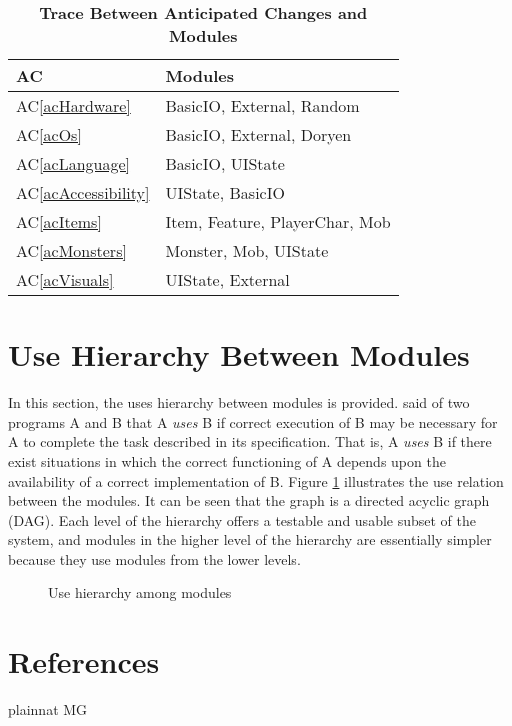 \documentclass[12pt, titlepage]{article}
\newcommand{\newSection}[1]{
  \newpage
  \section{#1}
}
\newcommand{\acref}[1]{AC\ref{#1}}
\begin{document}
\begin{table}[H] 
    \label{TblACT}
    \caption{\bf Trace Between Anticipated Changes and Modules}
    
    \def\arraystretch{1.2}
    \centering
    \bigskip
    \begin{tabular}{p{} p{}}

        \toprule
        \textbf{AC} & \textbf{Modules}\\
        \midrule
        \acref{acHardware} & BasicIO, External, Random\\
        \acref{acOs} & BasicIO, External, Doryen\\
        \acref{acLanguage} & BasicIO, UIState\\
        \acref{acAccessibility} & UIState, BasicIO\\
        \acref{acItems} & Item, Feature, PlayerChar, Mob\\
        \acref{acMonsters} & Monster, Mob, UIState\\
        \acref{acVisuals} & UIState, External\\

        \bottomrule
    \end{tabular}
\end{table}

\newSection{Use Hierarchy Between Modules} \label{SecUse}

    In this section, the uses hierarchy between modules is provided. \citet{Parnas1978} said of two programs A and B that A {\em uses} B if correct execution of B may be necessary for A to complete the task described in its specification. That is, A {\em uses} B if there exist situations in which the correct functioning of A depends upon the availability of a correct implementation of B.  Figure \ref{FigUH} illustrates the use relation between the modules. It can be seen that the graph is a directed acyclic graph (DAG). Each level of the hierarchy offers a testable and usable subset of the system, and modules in the higher level of the hierarchy are essentially simpler because they use modules from the lower levels.

    \begin{figure}[H]
        \centering
        \caption{Use hierarchy among modules}
        \label{FigUH}
    \end{figure}

\newSection{References} \label{SecRef}

     {plainnat}
     {MG}
\end{document}
